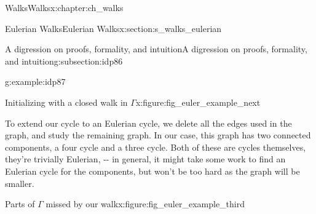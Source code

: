 \documentclass[oneside,10pt,]{book}
\numberwithin{equation}{section}
\begin{document}
\begin{chapterptx}{Walks}{}{Walks}{}{}{x:chapter:ch_walks}
\begin{sectionptx}{Eulerian Walks}{}{Eulerian Walks}{}{}{x:section:s_walks_eulerian}
\begin{subsectionptx}{A digression on proofs, formality, and intuition}{}{A digression on proofs, formality, and intuition}{}{}{g:subsection:idp86}
\begin{example}{}{g:example:idp87}
\begin{figureptx}{Initializing with a closed walk in \(\Gamma\)}{x:figure:fig_euler_example_next}{}
\begin{image}{0.15}{0.7}{0.15}
{
}%
\end{image}%
\tcblower
\end{figureptx}%
To extend our cycle to an Eulerian cycle, we delete all the edges used in the graph, and study the remaining graph.  In our case, this graph has two connected components, a four cycle and a three cycle.  Both of these are cycles themselves, they're trivially Eulerian, -{}-{} in general, it might take some work to find an Eulerian cycle for the components, but won't be too hard as the graph will be smaller.%
\begin{figureptx}{Parts of \(\Gamma\) missed by our walk}{x:figure:fig_euler_example_third}{}%
\begin{image}{0.15}{0.7}{0.15}%
\end{image}
\end{figureptx}
\end{example}
\end{subsectionptx}
\end{sectionptx}
\end{chapterptx}
\end{document}
